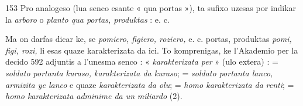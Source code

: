 \begin{VUpage}[157]{153}
Pro analogeso (lua senco esante « qua portas »), ta sufixo\nl
uzesas por indikar la \textit{arboro} o \textit{planto qua portas, produktas} :\nl
{}\nl
{} e. c.

Ma on darfas dicar ke, se \textit{pomiero, figiero, roziero,} e. c.\nl
portas, produktas \textit{pomi, figi, rozi,} li esas quaze karakterizata\nl
da ici. To komprenigas, ke l'Akademio per la decido 592\nl
adjuntis a l'unesma senco : « \textit{karakterizata per} » (ulo extera) :\nl
{} = \textit{soldato portanta kuraso, karakterizata da kuraso};\nl
{} = \textit{soldato portanta lanco, armizita ye lanco} e quaze\nl
\textit{karakterizata da olu};  = \textit{homo karakterizata da}\nl
\textit{renti};  = \textit{homo karakterizata adminime da un}\nl
\textit{miliardo} (2).
\end{VUpage}

